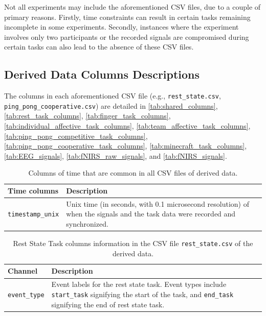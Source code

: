 Not all experiments may include the aforementioned CSV files, due to a couple
of primary reasons. Firstly, time constraints can result in certain tasks
remaining incomplete in some experiments. Secondly, instances where the
experiment involves only two participants or the recorded signals are
compromised during certain tasks can also lead to the absence of these CSV
files.

\subsection{Derived Data Columns Descriptions}
\label{sec:derived_data_cols_desc}

The columns in each aforementioned CSV file (e.g., \texttt{rest\_state.csv},
\texttt{ping\_pong\_cooperative.csv}) are detailed in
\autoref{tab:shared_columns}, \autoref{tab:rest_task_columns},
\autoref{tab:finger_task_columns},
\autoref{tab:individual_affective_task_columns},
\autoref{tab:team_affective_task_columns},
\autoref{tab:ping_pong_competitive_task_columns},
\autoref{tab:ping_pong_cooperative_task_columns},
\autoref{tab:minecraft_task_columns}, \autoref{tab:EEG_signals},
\autoref{tab:fNIRS_raw_signals}, and \autoref{tab:fNIRS_signals}.


\begin{table}
    \footnotesize
    \centering
    \begin{tabularx}{\textwidth}{lX}
        \toprule
        Time columns & Description \\
        \midrule
        \texttt{timestamp\_unix} & Unix time (in seconds, with 0.1 microsecond resolution) of when the signals and the task data were recorded and synchronized.\\
        \bottomrule
    \end{tabularx}
    \caption{Columns of time that are common in all CSV files of derived data.}
    \label{tab:shared_columns}
\end{table}


\begin{table}
\centering
\begin{tabularx}{\textwidth}{lX}
    \toprule
Channel & Description \\
\midrule
\texttt{event\_type} & Event labels for the rest state task. Event types include \texttt{start\_task} signifying the start of the task, and \texttt{end\_task} signifying the end of rest state task.\\
\bottomrule
\end{tabularx}
\caption{Rest State Task columns information in the CSV file \texttt{rest\_state.csv} of the derived data.}
\label{tab:rest_task_columns}
\end{table}

